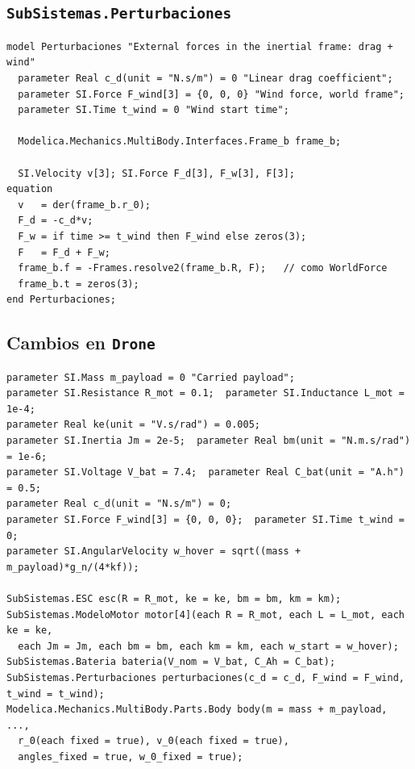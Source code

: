 \subsection{\texttt{SubSistemas.Perturbaciones}}
\begin{lstlisting}
model Perturbaciones "External forces in the inertial frame: drag + wind"
  parameter Real c_d(unit = "N.s/m") = 0 "Linear drag coefficient";
  parameter SI.Force F_wind[3] = {0, 0, 0} "Wind force, world frame";
  parameter SI.Time t_wind = 0 "Wind start time";

  Modelica.Mechanics.MultiBody.Interfaces.Frame_b frame_b;

  SI.Velocity v[3]; SI.Force F_d[3], F_w[3], F[3];
equation
  v   = der(frame_b.r_0);
  F_d = -c_d*v;
  F_w = if time >= t_wind then F_wind else zeros(3);
  F   = F_d + F_w;
  frame_b.f = -Frames.resolve2(frame_b.R, F);   // como WorldForce
  frame_b.t = zeros(3);
end Perturbaciones;
\end{lstlisting}

\subsection{Cambios en \texttt{Drone}}
\begin{lstlisting}
parameter SI.Mass m_payload = 0 "Carried payload";
parameter SI.Resistance R_mot = 0.1;  parameter SI.Inductance L_mot = 1e-4;
parameter Real ke(unit = "V.s/rad") = 0.005;
parameter SI.Inertia Jm = 2e-5;  parameter Real bm(unit = "N.m.s/rad") = 1e-6;
parameter SI.Voltage V_bat = 7.4;  parameter Real C_bat(unit = "A.h") = 0.5;
parameter Real c_d(unit = "N.s/m") = 0;
parameter SI.Force F_wind[3] = {0, 0, 0};  parameter SI.Time t_wind = 0;
parameter SI.AngularVelocity w_hover = sqrt((mass + m_payload)*g_n/(4*kf));

SubSistemas.ESC esc(R = R_mot, ke = ke, bm = bm, km = km);
SubSistemas.ModeloMotor motor[4](each R = R_mot, each L = L_mot, each ke = ke,
  each Jm = Jm, each bm = bm, each km = km, each w_start = w_hover);
SubSistemas.Bateria bateria(V_nom = V_bat, C_Ah = C_bat);
SubSistemas.Perturbaciones perturbaciones(c_d = c_d, F_wind = F_wind, t_wind = t_wind);
Modelica.Mechanics.MultiBody.Parts.Body body(m = mass + m_payload, ...,
  r_0(each fixed = true), v_0(each fixed = true),
  angles_fixed = true, w_0_fixed = true);
\end{lstlisting}
